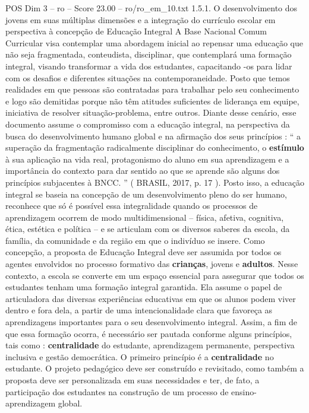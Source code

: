 \begin{textsample}{POS Dim 3 – ro – Score 23.00 – ro/ro\_em\_10.txt}  \label{ex:f3_pos_137}
1.5.1.
O desenvolvimento dos jovens em suas múltiplas dimensões e a integração do currículo escolar em perspectiva à concepção de Educação Integral A Base Nacional Comum Curricular visa contemplar uma abordagem inicial ao repensar uma educação que não seja fragmentada, conteudista, disciplinar, que contemplará uma formação integral, visando transformar a vida dos estudantes, capacitando -os para lidar com os desafios e diferentes situações na contemporaneidade.
Posto que temos realidades em que pessoas são contratadas para trabalhar pelo seu conhecimento e logo são demitidas porque não têm atitudes suficientes de liderança em equipe, iniciativa de resolver situação-problema, entre outros.
Diante desse cenário, esse documento assume o compromisso com a educação integral, na perspectiva da busca do desenvolvimento humano global e na afirmação dos seus princípios : “ a superação da fragmentação radicalmente disciplinar do conhecimento, o \textbf{estímulo} à sua aplicação na vida real, protagonismo do aluno em sua aprendizagem e a importância do contexto para dar sentido ao que se aprende são alguns dos princípios subjacentes à BNCC. ” ( BRASIL, 2017, p. 17 ).
Posto isso, a educação integral se baseia na concepção de um desenvolvimento pleno do ser humano, reconhece que só é possível essa integralidade quando os processos de aprendizagem ocorrem de modo multidimensional – física, afetiva, cognitiva, ética, estética e política – e se articulam com os diversos saberes da escola, da família, da comunidade e da região em que o indivíduo se insere.
Como concepção, a proposta de Educação Integral deve ser assumida por todos os agentes envolvidos no processo formativo das \textbf{crianças}, jovens e \textbf{adultos}.
Nesse contexto, a escola se converte em um espaço essencial para assegurar que todos os estudantes tenham uma formação integral garantida.
Ela assume o papel de articuladora das diversas experiências educativas em que os alunos podem viver dentro e fora dela, a partir de uma intencionalidade clara que favoreça as aprendizagens importantes para o seu desenvolvimento integral.
Assim, a fim de que essa formação ocorra, é necessário ser pautada conforme alguns princípios, tais como : \textbf{centralidade} do estudante, aprendizagem permanente, perspectiva inclusiva e gestão democrática.
O primeiro princípio é a \textbf{centralidade} no estudante.
O projeto pedagógico deve ser construído e revisitado, como também a proposta deve ser personalizada em suas necessidades e ter, de fato, a participação dos estudantes na construção de um processo de ensino-aprendizagem global.

\end{textsample}

